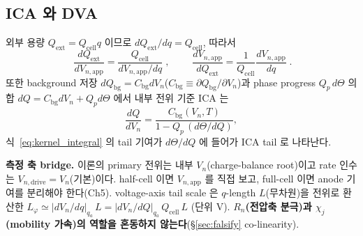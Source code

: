 \documentclass[11pt,a4paper]{article}
\newcommand{\app}{\mathrm{app}}
\newcommand{\drive}{\mathrm{drive}}
\newcommand{\bg}{\mathrm{bg}}
\newcommand{\cell}{\mathrm{cell}}
\newcommand{\ext}{\mathrm{ext}}
\begin{document}
\subsection{ICA 와 DVA}
외부 용량 $Q_\ext=Q_\cell q$ 이므로 $dQ_\ext/dq=Q_\cell$, 따라서
\begin{equation}
\boxed{\;\frac{dQ_\ext}{dV_{n,\app}}=\frac{Q_\cell}{dV_{n,\app}/dq}\;},\qquad
\boxed{\;\frac{dV_{n,\app}}{dQ_\ext}=\frac{1}{Q_\cell}\frac{dV_{n,\app}}{dq}\;}.
\label{eq:icadva}
\end{equation}
또한 background 저장 $dQ_\bg=C_\bg dV_n$($C_\bg\equiv\partial Q_\bg/\partial V_n$)과 phase progress
$Q_p\,d\Theta$ 의 합 $dQ=C_\bg dV_n+Q_p d\Theta$ 에서 내부 전위 기준 ICA 는
\begin{equation}
\frac{dQ}{dV_n}=\frac{C_\bg(V_n,T)}{1-Q_p\,(d\Theta/dQ)},
\label{eq:ica_internal}
\end{equation}
식~\eqref{eq:kernel_integral} 의 tail 기여가 $d\Theta/dQ$ 에 들어가 ICA tail 로 나타난다.

\textbf{측정 축 bridge.} 이론의 primary 전위는 내부 $V_n$(charge-balance root)이고 rate 인수는
$V_{n,\drive}=V_n$(기본)이다. half-cell 이면 $V_{n,\app}$ 를 직접 보고, full-cell 이면 anode 기여를 분리해야
한다(Ch5). voltage-axis tail scale 은 $q$-length $L$(무차원)을 전위로 환산한
$L_\varphi\simeq|dV_n/dq|_{q_a}\,L=|dV_n/dQ|_{q_a}\,Q_\cell\,L$ (단위 V). \textbf{$R_n$(전압축 분극)과
$\chi_j$(mobility 가속)의 역할을 혼동하지 않는다}(\S\ref{sec:falsify} co-linearity).

\end{document}

